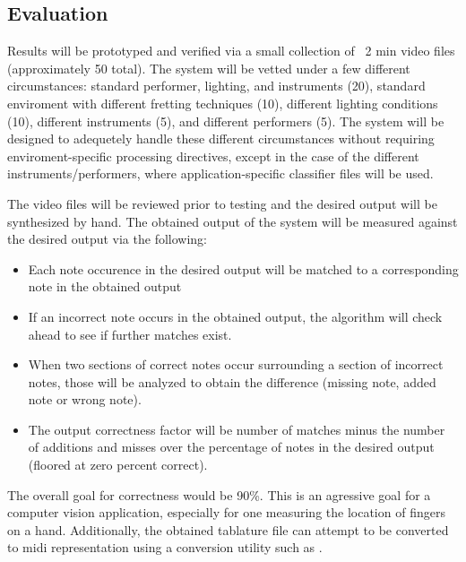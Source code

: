 \subsection{Evaluation}
Results will be prototyped and verified via a small collection of ~2 min video files
(approximately 50 total).
The system will be vetted under a few different circumstances:
standard performer, lighting, and instruments (20),
standard enviroment with different fretting techniques (10),
different lighting conditions (10),
different instruments (5),
and different performers (5).
The system will be designed to adequetely handle these different circumstances
without requiring enviroment-specific processing directives,
except in the case of the different instruments/performers,
where application-specific classifier files will be used.
\par
The video files will be reviewed prior to testing and the desired output will be synthesized by hand.
The obtained output of the system will be measured against the desired output via the following:
\begin{itemize}
    \item Each note occurence in the desired output will be matched to a corresponding note in the obtained output
    \item If an incorrect note occurs in the obtained output, the algorithm will check ahead to see if further
        matches exist.
    \item When two sections of correct notes occur surrounding a section of incorrect notes, those will
        be analyzed to obtain the difference (missing note, added note or wrong note).
    \item The output correctness factor will be number of matches minus the number of additions and misses
        over the percentage of notes in the desired output (floored at zero percent correct).
\end{itemize}
\par
The overall goal for correctness would be 90\%.
This is an agressive goal for a computer vision application,
especially for one measuring the location of fingers on a hand.
Additionally, the obtained tablature file can attempt to be converted to midi representation
using a conversion utility such as \cite{8notes}.
